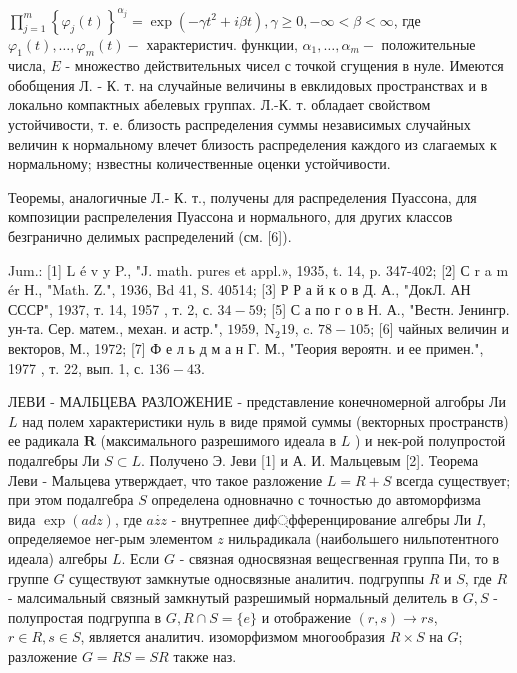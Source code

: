 \documentclass[10pt]{article}
\begin{document}
$\prod_{j=1}^{m}\left\{\varphi_{j}(t)\right\}^{\alpha_{j}}=\exp \left(-\gamma t^{2}+i \beta t\right), \gamma \geqslant 0,-\infty<\beta<\infty$, где $\varphi_{1}(t), \ldots, \varphi_{m}(t)-$ характеристич. функции, $\alpha_{1}, \ldots, \alpha_{m}-$ положительные числа, $E$ - множество действительных чисел с точкой сгущения в нуле. Имеются обобщения Л. - К. т. на случайные величины в евклидовых пространствах и в локально компактных абелевых группах. Л.-К. т. обладает свойством устойчивости, т. е. близость распределения суммы независимых случайных величин к нормальному влечет близость распределения каждого из слагаемых к нормальному; нзвестны количественные оценки устойчивости.



Теоремы, аналогичные Л.- К. т., получены для распределения Пуассона, для композиции распрелеления Пуассона и нормального, для других классов безгранично делимых распределений (см. [6]).



Jum.: [1] L é v y P., "J. math. pures et appl.», 1935, t. 14, p. 347-402; [2] С r a m ér Н., "Math. Z.", 1936, Bd 41, S. 40514; [3] Р Р а й к о в Д. А., "ДокЛ. АН СССР", 1937, т. 14, 1957 , т. 2, с. $34-59$; [5] С а по г о в Н. А., "Вестн. Јенингр. ун-та. Сер. матем., механ. и астр.", $1959, \mathrm{~N}_{2} 19$, c. $78-105$; [6] чайных величин и векторов, М., 1972; [7] Ф е л ь д м а н Г. М., "Теория вероятн. и ее примен.", 1977 , т. 22, вып. 1, с. $136-43$.



ЛЕВИ - МАЛБЦЕВА РАЗЛОЖЕНИЕ - представление конечномерной алгобры Ли $L$ над полем характеристики нуль в виде прямой суммы (векторных пространств) ее радикала $\boldsymbol{R}$ (максимального разрешимого идеала в $L$ ) и нек-рой полупростой подалгебры Ли $S \subset L$. Получено Э. Јеви [1] и А. И. Мальцевым [2]. Теорема Леви - Мальцева утверждает, что такое разложение $L=R+S$ всегда существует; при этом подалгебра $S$ определена одновначно с точностью до автоморфизма вида $\exp (a d z)$, где $a \dot{z z}$ - внутрепнее диф্фференцирование алгебры Ли $I$, определяемое нег-рым элементом $z$ нильрадикала (наибольшего нильпотентного идеала) алгебры $L$. Если $G$ - связная односвязная вещесгвенная группа Пи, то в группе $G$ существуют замкнутые односвязные аналитич. подгруппы $R$ и $S$, где $R$ - малсимальный связный замкнутый разрешимый нормальный делитель в $G, S$ - полупростая подгруппа в $G, R \cap S=\{e\}$ и отображение $(r, s) \rightarrow r s$, $r \in R, s \in S$, является аналитич. изоморфизмом многообразия $R \times S$ на $G$; разложение $G=R S=S R$ также наз.
\end{document}
